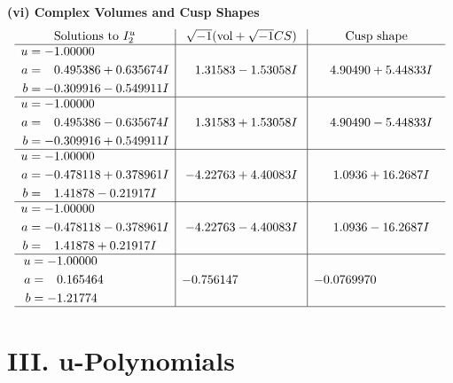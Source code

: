 \documentclass[1p]{elsarticle_modified}
\theoremstyle{definition}
\newcommand{\I}{\sqrt{-1}}
\begin{document}
\newpage\flushleft \textbf{(vi) Complex Volumes and Cusp Shapes}
$$\begin{array}{c|c|c}  
\text{Solutions to }I^u_{2}& \I (\text{vol} + \sqrt{-1}CS) & \text{Cusp shape}\\
 \hline 
\begin{aligned}
u &= -1.00000\phantom{ +0.000000I} \\
a &= \phantom{-}0.495386 + 0.635674 I \\
b &= -0.309916 - 0.549911 I\end{aligned}
 & \phantom{-}1.31583 - 1.53058 I & \phantom{-}4.90490 + 5.44833 I \\ \hline\begin{aligned}
u &= -1.00000\phantom{ +0.000000I} \\
a &= \phantom{-}0.495386 - 0.635674 I \\
b &= -0.309916 + 0.549911 I\end{aligned}
 & \phantom{-}1.31583 + 1.53058 I & \phantom{-}4.90490 - 5.44833 I \\ \hline\begin{aligned}
u &= -1.00000\phantom{ +0.000000I} \\
a &= -0.478118 + 0.378961 I \\
b &= \phantom{-}1.41878 - 0.21917 I\end{aligned}
 & -4.22763 + 4.40083 I & \phantom{-}1.0936 + 16.2687 I \\ \hline\begin{aligned}
u &= -1.00000\phantom{ +0.000000I} \\
a &= -0.478118 - 0.378961 I \\
b &= \phantom{-}1.41878 + 0.21917 I\end{aligned}
 & -4.22763 - 4.40083 I & \phantom{-}1.0936 - 16.2687 I \\ \hline\begin{aligned}
u &= -1.00000\phantom{ +0.000000I} \\
a &= \phantom{-}0.165464\phantom{ +0.000000I} \\
b &= -1.21774\phantom{ +0.000000I}\end{aligned}
 & -0.756147\phantom{ +0.000000I} & -0.0769970\phantom{ +0.000000I}\\
 \hline 
 \end{array}$$\newpage
\newpage\renewcommand{\arraystretch}{1}
\centering \section*{ III. u-Polynomials}
\end{document}
